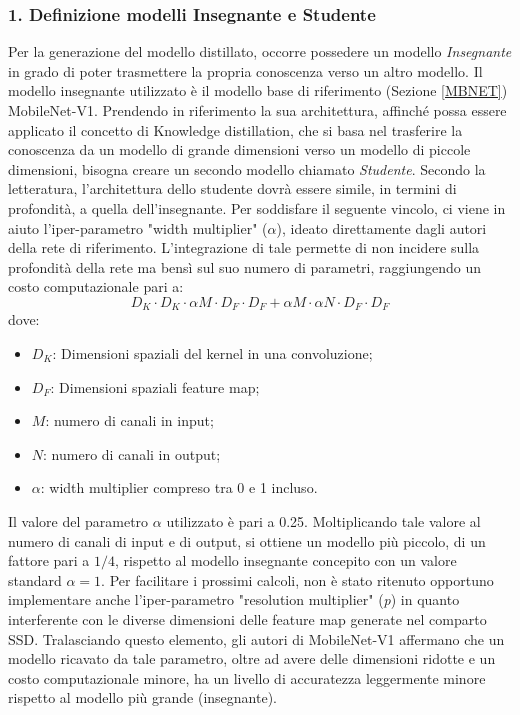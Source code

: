 \subsubsection{1. Definizione modelli Insegnante e Studente}
Per la generazione del modello distillato, occorre possedere un modello 
\emph{Insegnante} in grado di poter trasmettere la propria conoscenza verso un 
altro modello. Il modello insegnante utilizzato è il modello base di riferimento 
(Sezione \ref{MBNET}) MobileNet-V1. Prendendo in riferimento la sua architettura, 
affinché possa essere applicato il concetto di Knowledge distillation, che 
si basa nel trasferire la conoscenza da un modello di grande dimensioni 
verso un modello di piccole dimensioni, bisogna creare un secondo modello 
chiamato \emph{Studente}. Secondo la letteratura, l'architettura dello studente 
dovrà essere simile, in termini di profondità, a quella dell'insegnante. Per 
soddisfare il seguente vincolo,  ci viene in aiuto l'iper-parametro "width 
multiplier" ($\alpha$), ideato direttamente dagli autori della rete di riferimento. 
L'integrazione di tale permette di non incidere sulla profondità della rete ma 
bensì sul suo numero di parametri, raggiungendo un costo computazionale 
pari a:
\begin{equation}
    D_K \cdot D_K \cdot \alpha M \cdot D_F \cdot D_F + \alpha M \cdot \alpha N \cdot D_F \cdot D_F
\end{equation}
dove:
\begin{itemize}
    \item $D_K$: Dimensioni spaziali del kernel in una convoluzione;
    \item $D_F$: Dimensioni spaziali feature map;
    \item $M$: numero di canali in input;
    \item $N$: numero di canali in output;
    \item $\alpha$: width multiplier compreso tra 0 e 1 incluso.
\end{itemize}
Il valore del parametro $\alpha$ utilizzato è pari a 0.25. Moltiplicando tale valore 
al numero di canali di input e di output, si ottiene un modello più piccolo, 
di un fattore pari a $1/4$, rispetto al modello insegnante concepito con un 
valore standard $\alpha=1$. Per facilitare i prossimi calcoli, non è stato ritenuto 
opportuno implementare anche l'iper-parametro "resolution multiplier" (\emph{p}) 
in quanto interferente con le diverse dimensioni delle feature map generate 
nel comparto SSD. Tralasciando questo elemento, gli autori di MobileNet-V1 
affermano che un modello ricavato da tale parametro, oltre ad avere 
delle dimensioni ridotte e un costo computazionale minore, ha un livello di 
accuratezza leggermente minore rispetto al modello più grande (insegnante). 

